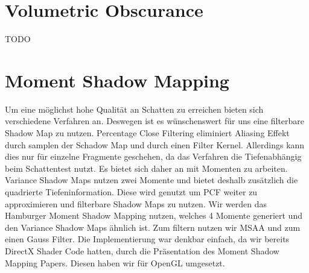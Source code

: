 \documentclass[runningheaders,a4paper]{llncs}
\begin{document}
\section{Volumetric Obscurance}

	TODO
	



\section{Moment Shadow Mapping}

Um eine möglichst hohe Qualität an Schatten zu erreichen bieten sich verschiedene Verfahren an. Deswegen ist es wünschenswert für uns eine filterbare Shadow Map zu nutzen. Percentage Close Filtering eliminiert Aliasing Effekt durch samplen der Schadow Map und durch einen Filter Kernel.\cite{msm} 
Allerdings kann dies nur für einzelne Fragmente geschehen, da das Verfahren die Tiefenabhängig beim Schattentest nutzt.\cite{msm}
Es bietet sich daher an mit Momenten zu arbeiten. Variance Shadow Maps nutzen zwei Momente und bietet deshalb zusätzlich die quadrierte Tiefeninformation. Diese wird genutzt um PCF weiter zu approximieren und filterbare Shadow Maps zu nutzen.
Wir werden das Hamburger Moment Shadow Mapping nutzen, welches 4 Momente generiert und den Variance Shadow Maps ähnlich ist. Zum filtern nutzen wir MSAA und zum einen Gauss Filter. Die Implementierung war denkbar einfach, da wir bereits DirectX Shader Code hatten, durch die Präsentation des Moment Shadow Mapping Papers\cite{msm}. Diesen haben wir für OpenGL umgesetzt.

\end{document}
